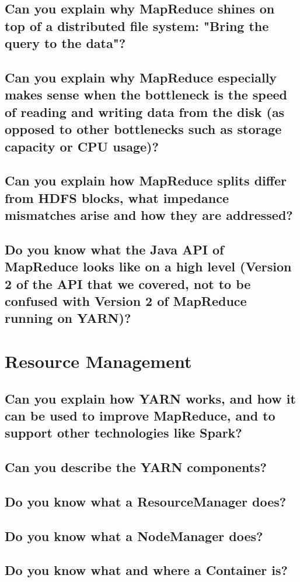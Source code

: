 \documentclass{article}
\begin{document}
\subsection{Can you explain why MapReduce shines on top of a distributed file system: "Bring the query to the data"?}
\subsection{Can you explain why MapReduce especially makes sense when the bottleneck is the speed of reading and writing data from the disk (as opposed to other bottlenecks such as storage capacity or CPU usage)?}
\subsection{Can you explain how MapReduce splits differ from HDFS blocks, what impedance mismatches arise and how they are addressed?}
\subsection{Do you know what the Java API of MapReduce looks like on a high level (Version 2 of the API that we covered, not to be confused with Version 2 of MapReduce running on YARN)?}

\pagebreak

\section{Resource Management}
\subsection{Can you explain how YARN works, and how it can be used to improve MapReduce, and to support other technologies like Spark?}
\subsection{Can you describe the YARN components?}
\subsection{Do you know what a ResourceManager does?}
\subsection{Do you know what a NodeManager does?}
\subsection{Do you know what and where a Container is?}
\end{document}
